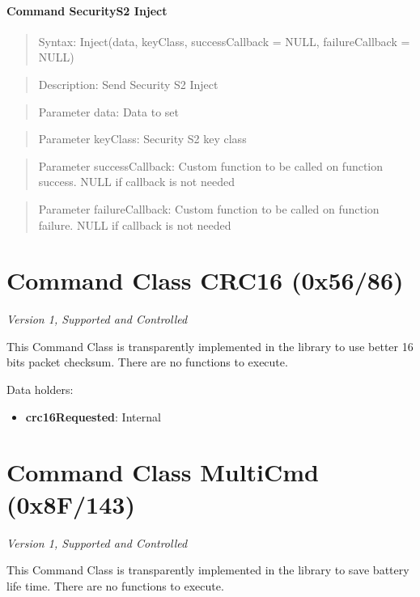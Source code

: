 \paragraph{Command SecurityS2 Inject}
\begin{quote}Syntax: Inject(data, keyClass, successCallback = NULL, failureCallback = NULL)\end{quote}
\begin{quote}Description: Send Security S2 Inject\end{quote}
\begin{quote}Parameter data: Data to set\end{quote}
\begin{quote}Parameter keyClass: Security S2 key class\end{quote}
\begin{quote}Parameter successCallback: Custom function to be called on function success. NULL if callback is not needed\end{quote}
\begin{quote}Parameter failureCallback: Custom function to be called on function failure. NULL if callback is not needed\end{quote}



\section{Command Class CRC16 (0x56/86)}

\textit{Version 1, Supported and Controlled}
\newline

This Command Class is transparently implemented in the library to use better 16 bits packet checksum. There are no functions to execute.
\newline

\noindent
Data holders:

\begin{itemize}
\item \textbf{crc16Requested}: Internal
\end{itemize}


\section{Command Class MultiCmd (0x8F/143)}

\textit{Version 1, Supported and Controlled}
\newline

This Command Class is transparently implemented in the library to save battery life time. There are no functions to execute.
\newline

